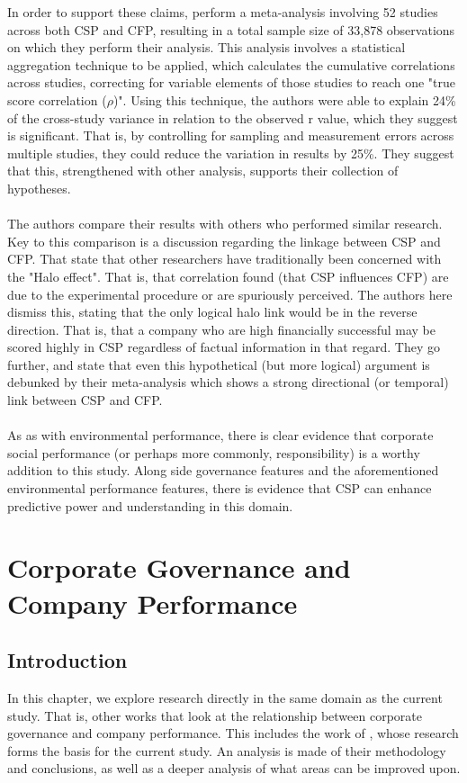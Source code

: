 {In order to support these claims, \cite{orlitzky2003corporate} perform a meta-analysis involving 52 studies across both CSP and CFP, resulting in a total sample size of 33,878 observations on which they perform their analysis. This analysis involves a statistical aggregation technique to be applied, which calculates the cumulative correlations across studies, correcting for variable elements of those studies to reach one "true score correlation ($\rho$)". Using this technique, the authors were able to explain 24\% of the cross-study variance in relation to the observed r value, which they suggest is significant. That is, by controlling for sampling and measurement errors across multiple studies, they could reduce the variation in results by 25\%. They suggest that this, strengthened with other analysis, supports their collection of hypotheses.\\\\
The authors compare their results with others who performed similar research. Key to this comparison is a discussion regarding the linkage between CSP and CFP. That state that other researchers have traditionally been concerned with the "Halo effect". That is, that correlation found (that CSP influences CFP) are due to the experimental procedure or are spuriously perceived. The authors here dismiss this, stating that the only logical halo link would be in the reverse direction. That is, that a company who are high financially successful may be scored highly in CSP regardless of factual information in that regard. They go further, and state that even this hypothetical (but more logical) argument is debunked by their meta-analysis which shows a strong directional (or temporal) link between CSP and CFP. \\\\
As as with environmental performance, there is clear evidence that corporate social performance (or perhaps more commonly, responsibility) is a worthy addition to this study. Along side governance features and the aforementioned environmental performance features, there is evidence that CSP can enhance predictive power and understanding in this domain.    }
\section{Corporate Governance and Company Performance}
\subsection{Introduction}
{In this chapter, we explore research directly in the same domain as the current study. That is, other works that look at the relationship between corporate governance and company performance. This includes the work of \cite{moldovan2015learning}, whose research forms the basis for the current study. An analysis is made of their methodology and conclusions, as well as a deeper analysis of what areas can be improved upon.}
